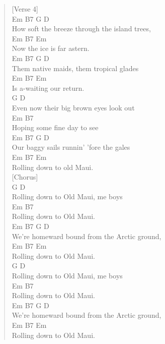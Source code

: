 \documentclass[11pt]{article}
\begin{document}
\begin{verse}
[Verse 4]\\
\hspace*{4em}Em       B7                 G      D\\
How soft the breeze through the island trees,\\
\hspace*{8em}Em     B7  Em\\
Now the ice is far astern.\\
\hspace*{5em}Em     B7          G        D\\
Them native maids, them tropical glades\\
\hspace*{6em}Em      B7    Em\\
Is a-waiting our return.\\
\hspace*{5em}G                   D\\
Even now their big brown eyes look out\\
\hspace*{7em}Em               B7\\
Hoping some fine day to see\\
\hspace*{4em}Em    B7             G        D\\
Our baggy sails runnin' 'fore the gales\\
\hspace*{8em}Em      B7    Em\\
Rolling down to old Maui.\\
\vspace*{1em}
[Chorus]\\
\hspace*{8em}G             D\\
Rolling down to Old Maui, me boys\\
\hspace*{8em}Em            B7\\
Rolling down to Old Maui.\\
\hspace*{6em}Em       B7             G      D\\
We're homeward bound from the Arctic ground,\\
\hspace*{8em}Em      B7    Em\\
Rolling down to Old Maui.\\
\vspace*{1em}
\hspace*{8em}G             D\\
Rolling down to Old Maui, me boys\\
\hspace*{8em}Em            B7\\
Rolling down to Old Maui.\\
\hspace*{6em}Em       B7             G      D\\
We're homeward bound from the Arctic ground,\\
\hspace*{8em}Em      B7    Em\\
Rolling down to Old Maui.\\
\end{verse}
\clearpage
\end{document}
